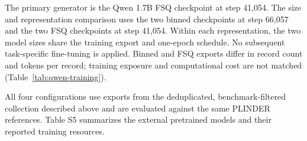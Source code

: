 The primary generator is the Qwen 1.7B FSQ checkpoint at step 41,054. The size and
representation comparison uses the two binned checkpoints at step 66,057 and the two
FSQ checkpoints at step 41,054. Within each representation, the two model sizes share
the training export and one-epoch schedule. No subsequent task-specific fine-tuning
is applied. Binned and FSQ exports differ in record count and tokens per record;
training exposure and computational cost are not matched (Table~\ref{tab:qwen-training}).

All four configurations use exports from the deduplicated, benchmark-filtered
collection described above and are evaluated against the same PLINDER references. Table S5
summarizes the external pretrained models and their reported training resources.
